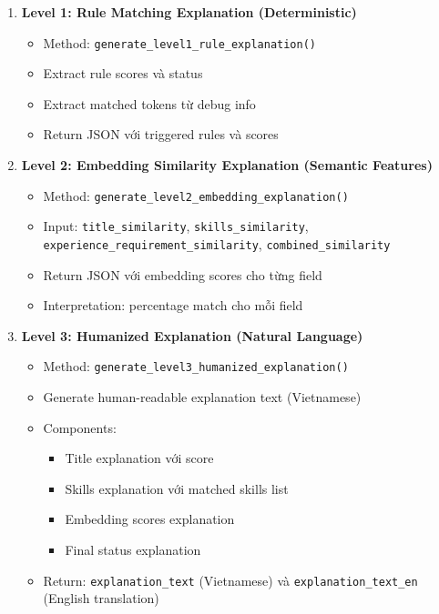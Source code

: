 \begin{enumerate}
    \item \textbf{Level 1: Rule Matching Explanation (Deterministic)}
    \begin{itemize}
        \item Method: \texttt{generate\_level1\_rule\_explanation()}
        \item Extract rule scores và status
        \item Extract matched tokens từ debug info
        \item Return JSON với triggered rules và scores
    \end{itemize}
    
    \item \textbf{Level 2: Embedding Similarity Explanation (Semantic Features)}
    \begin{itemize}
        \item Method: \texttt{generate\_level2\_embedding\_explanation()}
        \item Input: \texttt{title\_similarity}, \texttt{skills\_similarity}, \texttt{experience\_requirement\_similarity}, \texttt{combined\_similarity}
        \item Return JSON với embedding scores cho từng field
        \item Interpretation: percentage match cho mỗi field
    \end{itemize}
    
    \item \textbf{Level 3: Humanized Explanation (Natural Language)}
    \begin{itemize}
        \item Method: \texttt{generate\_level3\_humanized\_explanation()}
        \item Generate human-readable explanation text (Vietnamese)
        \item Components:
        \begin{itemize}
            \item Title explanation với score
            \item Skills explanation với matched skills list
            \item Embedding scores explanation
            \item Final status explanation
        \end{itemize}
        \item Return: \texttt{explanation\_text} (Vietnamese) và \texttt{explanation\_text\_en} (English translation)
    \end{itemize}
    

\end{enumerate}
